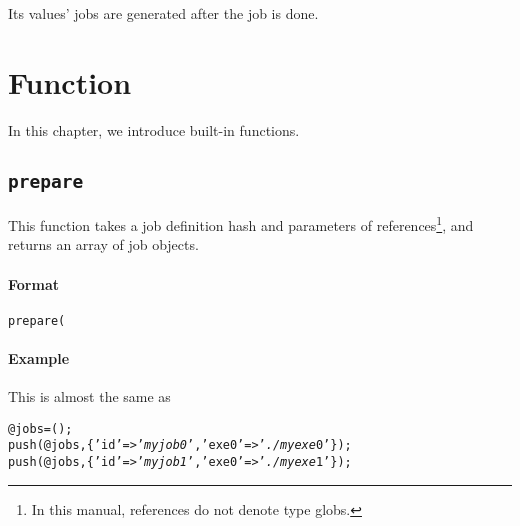 \documentclass[a4paper,10pt]{report}
\begin{document}
Its values' jobs are generated after the job is done.
\fi

\chapter{Function}\label{chapfun}

In this chapter, we introduce built-in functions.

\def\format{Format}
\def\example{Example}
\def\advanced{Advanced}

\section{\texttt{prepare}}\label{sec:prepare}

This function takes a job definition hash and parameters of
references\footnote{In this manual, references do not denote type
globs.}, and returns an array of job objects.


\subsubsection{\format}

\begin{boxnote}
\begin{alltt}
prepare(%template);
\end{alltt}
\end{boxnote}
\vspace{\baselineskip}

\subsubsection{\example}

\vspace{\baselineskip}


This is almost the same as
\begin{boxnote}
\begin{alltt}
@jobs = ();
push(@jobs, \{'id' => '\textit{myjob0}', 'exe0' => '\textit{./myexe} 0'\});
push(@jobs, \{'id' => '\textit{myjob1}', 'exe0' => '\textit{./myexe} 1'\});
\end{alltt}
\end{boxnote}
\vspace{\baselineskip}
\end{document}
